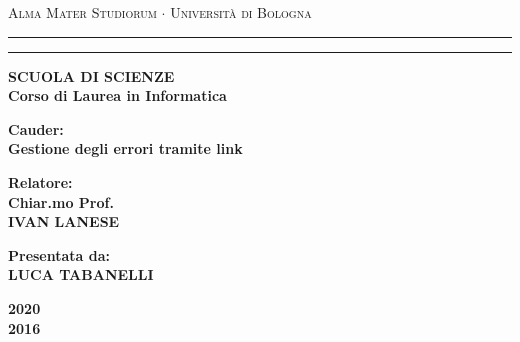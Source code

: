 \documentclass[a4paper,12pt]{article}
\begin{document}
\begin{titlepage}
\begin{center}
{{\Large{\textsc{Alma Mater Studiorum $\cdot$ Universit\`a di
Bologna}}}} \rule[0.1cm]{15.8cm}{0.1mm}
\rule[0.5cm]{15.8cm}{0.6mm}
{\small{\bf SCUOLA DI SCIENZE\\
Corso di Laurea in Informatica}}
\end{center}
\vspace{15mm}
\begin{center}
{\LARGE{\bf Cauder:}}\\
\vspace{3mm}
{\LARGE{\bf Gestione degli errori tramite link}}\\
\end{center}
\vspace{40mm}
\par
\noindent
\begin{minipage}[t]{0.47\textwidth}
{\large{\bf Relatore:\\
Chiar.mo Prof.\\
IVAN LANESE}}
\end{minipage}
\hfill
\begin{minipage}[t]{0.47\textwidth}\raggedleft
{\large{\bf Presentata da:\\
LUCA TABANELLI}}
\end{minipage}
\vspace{20mm}
\begin{center}
{\large{\bf 2020\\%
2016 }}%
\end{center}
\end{titlepage}
\tableofcontents





\clearpage
\printbibliography
\end{document}
